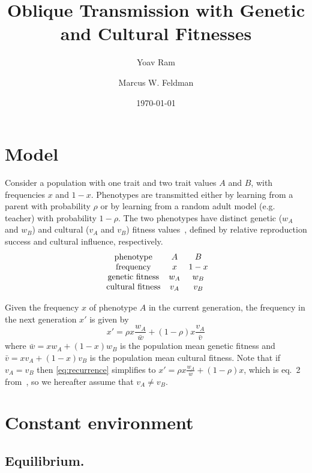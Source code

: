 \documentclass[14pt]{extarticle}
\title{Oblique Transmission with Genetic and Cultural Fitnesses}
\author{Yoav Ram}
\author{Marcus W. Feldman}
\affil{Department of Biology, Stanford University, Stanford, CA}
\date{\today}
\begin{document}
\maketitle

\section*{Model}

Consider a population with one trait and two trait values $A$ and $B$, with frequencies $x$ and $1-x$.
Phenotypes are transmitted either by learning from a parent with probability $\rho$ or by learning from a random adult model (e.g. teacher) with probability $1-\rho$.
The two phenotypes have distinct genetic ($w_A$ and $w_B$) and cultural ($v_A$ and $v_B$) fitness values~\citep{ElMouden2014}, defined by relative reproduction success and cultural influence, respectively.
\begin{equation} \label{eq:table}
\begin{array}{ccccc}
\hbox{ phenotype}&A&B\\
\hbox{ frequency}&x&1-x\\
\hbox{ genetic fitness}&w_A&w_B\\
\hbox{ cultural fitness}&v_A&v_B\\
\end{array}
\end{equation}

Given the frequency $x$ of phenotype $A$ in the current generation, the frequency in the next generation $x'$ is given by
\begin{equation} \label{eq:recurrence}
x' = \rho x \frac{w_A}{\bar w} + (1-\rho) x \frac{v_A}{\bar v} 
\end{equation}
where $\bar w = x w_A + (1-x) w_B$ is the population mean genetic fitness and $\bar v = x v_A + (1-x) v_B$ is the population mean cultural fitness. 
Note that if $v_A = v_B$ then \eqref{eq:recurrence} simplifies to 
$x' = \rho x \frac{w_A}{\bar w} + (1-\rho) x$,
which is eq.~2 from~\citet{Ram2018}, so we hereafter assume that $v_A \ne v_B$.

\newpage

\section*{Constant environment}
\subsection*{Equilibrium.}
\end{document}
